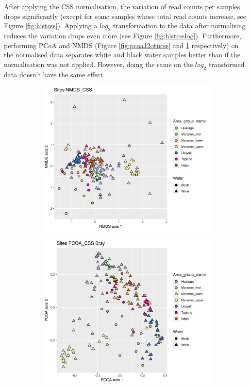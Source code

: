 After applying the CSS normalisation, the variation of read counts per samples drops significantly (except for some samples whose total read counts increase, see Figure \ref{fig:histcss}). Applying a $log_2$ transformation to the data after normalising reduces the variation drops even more (see Figure \ref{fig:histcsslog}). Furthermore, performing PCoA and NMDS (Figure \ref{fig:pcoa12otucss} and \ref{fig:nmds12otucss} respectively) on the normalised data separates white and black water samples better than if the normalisation was not applied. However, doing the same on the $log_2$ transformed data doesn't have the same effect.

\begin{figure}[h]
	\centering
	\begin{subfigure}{0.4\textwidth}
		\centering
		\includegraphics[width = \textwidth]{nmds12otucss}
		\caption{}
		\label{fig:nmds12otucss}
	\end{subfigure}
	\begin{subfigure}{0.4\textwidth}
		\centering
		\includegraphics[width = \textwidth]{pcoa12otucss}

\end{subfigure}
\end{figure}
